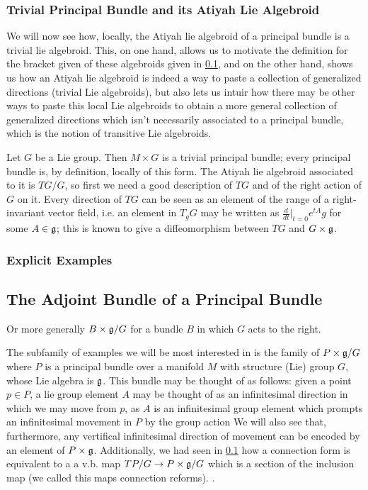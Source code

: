 \subsubsection{Trivial Principal Bundle and its Atiyah Lie Algebroid}

We will now see how, locally, the Atiyah lie algebroid of a principal bundle is a trivial lie algebroid. This, on one hand, allows us to motivate the definition for the bracket given of these algebroids given in \ref{}, and on the other hand, shows us how an Atiyah lie algebroid is indeed a way to paste a collection of generalized directions (trivial Lie algebroids), but also lets us intuir how there may be other ways to paste this local Lie algebroids to obtain a more general collection of generalized directions which isn't necessarily associated to a principal bundle, which is the notion of transitive Lie algebroids.

Let $G$ be a Lie group. Then $M \times G$ is a trivial principal bundle; every principal bundle is, by definition, locally of this form. The Atiyah lie algebroid associated to it is $TG/G$, so first we need a good description of $TG$ and of the right action of $G$ on it. Every direction of $TG$ can be seen as an element of the range of a right-invariant vector field, i.e. an element in $T_g G$ may be written as $\frac{d}{dt}|_{t=0}e^{tA}g$ for some $A \in \mathfrak{g}$; this is known to give a diffeomorphism between $TG$ and $G \times \mathfrak{g}$. 


\subsubsection{Explicit Examples}



\subsection{The Adjoint Bundle of a Principal Bundle}

Or more generally $B \times \mathfrak{g} / G$ for a bundle $B$ in which $G$ acts to the right.

The subfamily of examples we will be most interested in is the family of $P \times \mathfrak{g}/G$ where $P$ is a principal bundle over a manifold $M$ with structure (Lie) group $G$, whose Lie  algebra is $\mathfrak{g}$. This bundle may be thought of as follows: given a point $p \in P$, a lie group element $A$ may be thought of as an infinitesimal direction in which we may move from $p$, as $A$ is an infinitesimal group element which prompts an infinitesimal movement in $P$ by the group action We will also see that, furthermore, any vertifical infinitesimal direction of movement can be encoded by an element of $P \times \mathfrak{g}$. Additionally, we had seen in \ref{} how a connection form is equivalent to a  a v.b. map $TP/G \to P \times \mathfrak{g}/G$ which is a section of the inclusion map (we called this maps connection reforms). .


